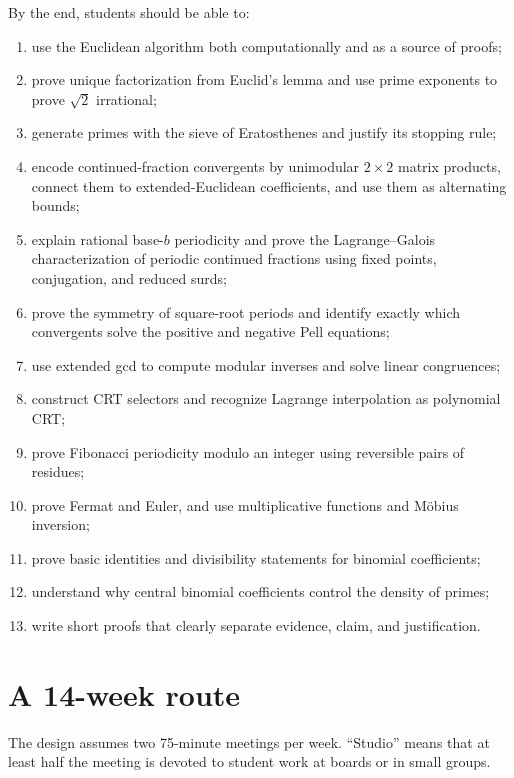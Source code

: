 By the end, students should be able to:
\begin{enumerate}
  \item use the Euclidean algorithm both computationally and as a source of proofs;
  \item prove unique factorization from Euclid's lemma and use prime exponents to prove $\sqrt2$ irrational;
  \item generate primes with the sieve of Eratosthenes and justify its stopping rule;
  \item encode continued-fraction convergents by unimodular $2\times2$ matrix products, connect them to extended-Euclidean coefficients, and use them as alternating bounds;
  \item explain rational base-$b$ periodicity and prove the Lagrange--Galois characterization of periodic continued fractions using fixed points, conjugation, and reduced surds;
  \item prove the symmetry of square-root periods and identify exactly
  which convergents solve the positive and negative Pell equations;
  \item use extended gcd to compute modular inverses and solve linear congruences;
  \item construct CRT selectors and recognize Lagrange interpolation as polynomial CRT;
  \item prove Fibonacci periodicity modulo an integer using reversible pairs of residues;
  \item prove Fermat and Euler, and use multiplicative functions and M\"obius inversion;
  \item prove basic identities and divisibility statements for binomial coefficients;
  \item understand why central binomial coefficients control the density of primes;
  \item write short proofs that clearly separate evidence, claim, and justification.
\end{enumerate}

\section*{A 14-week route}

The design assumes two 75-minute meetings per week. ``Studio'' means that at least half the meeting is devoted to student work at boards or in small groups.

